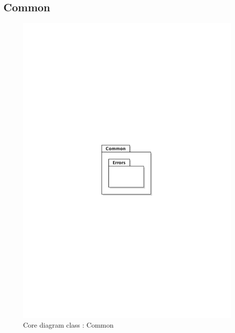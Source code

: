 	\subsection{Common}
		\begin{figure}[ht]
			\begin{center}
				\includegraphics[width=\textwidth,  trim=2cm 12cm 2cm 12cm]{UML_figure/DC/core/common/DC_Common.pdf}
				\caption{Core diagram class : Common}
			\end{center}
		\end{figure}
